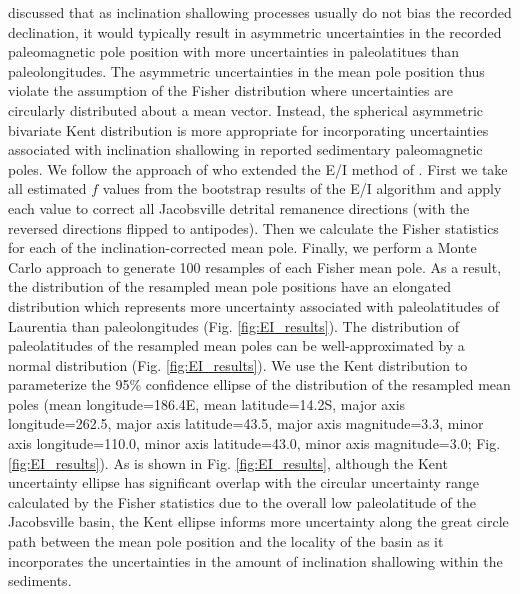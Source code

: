 \documentclass[draft]{agujournal2019}
\begin{document}
 discussed that as inclination shallowing processes usually do not bias the recorded declination, it would typically result in asymmetric uncertainties in the recorded paleomagnetic pole position with more uncertainties in paleolatitues than paleolongitudes. The asymmetric uncertainties in the mean pole position thus violate the assumption of the Fisher distribution \cite{Fisher1953a} where uncertainties are circularly distributed about a mean vector. Instead, the spherical asymmetric bivariate Kent distribution \cite{Kent1982a} is more appropriate for incorporating uncertainties associated with inclination shallowing in reported sedimentary paleomagnetic poles. We follow the approach of  who extended the E/I method of . First we take all estimated $f$ values from the bootstrap results of the E/I algorithm and apply each value to correct all Jacobsville detrital remanence directions (with the reversed directions flipped to antipodes). Then we calculate the Fisher statistics for each of the inclination-corrected mean pole. Finally, we perform a Monte Carlo approach to generate 100 resamples of each Fisher mean pole. As a result, the distribution of the resampled mean pole positions have an elongated distribution which represents more uncertainty associated with paleolatitudes of Laurentia than paleolongitudes (Fig. \ref{fig:EI_results}). The distribution of paleolatitudes of the resampled mean poles can be well-approximated by a normal distribution (Fig. \ref{fig:EI_results}). We use the Kent distribution to parameterize the 95\% confidence ellipse of the distribution of the resampled mean poles (mean longitude=186.4\textdegree E, mean latitude=14.2\textdegree S, major axis longitude=262.5, major axis latitude=43.5, major axis magnitude=3.3\textdegree, minor axis longitude=110.0, minor axis latitude=43.0, minor axis magnitude=3.0\textdegree; Fig. \ref{fig:EI_results}). As is shown in Fig. \ref{fig:EI_results}, although the Kent uncertainty ellipse has significant overlap with the circular uncertainty range calculated by the Fisher statistics due to the overall low paleolatitude of the Jacobsville basin, the Kent ellipse informs more uncertainty along the great circle path between the mean pole position and the locality of the basin as it incorporates the uncertainties in the amount of inclination shallowing within the sediments. 
\end{document}
